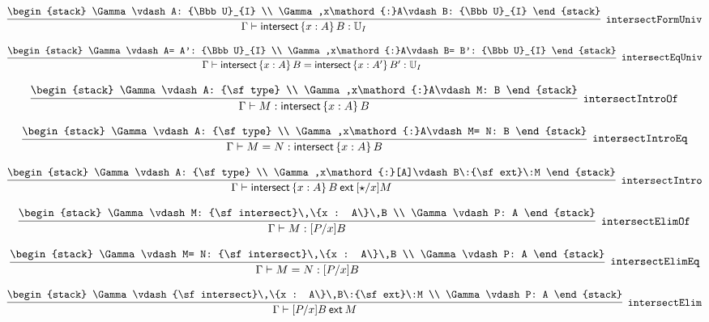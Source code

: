 \[
\infer[{\tt intersectFormUniv}]{\Gamma \vdash {\sf intersect}\,\{x : A\}\,B: {\Bbb U}_{I}}{
\begin{stack}
\Gamma \vdash A: {\Bbb U}_{I}
\\
\Gamma ,x\mathord{:}A\vdash B: {\Bbb U}_{I}
\end{stack}}
\]

\[
\infer[{\tt intersectEqUniv}]{\Gamma \vdash {\sf intersect}\,\{x : A\}\,B= {\sf intersect}\,\{x : A'\}\,B': {\Bbb U}_{I}}{
\begin{stack}
\Gamma \vdash A= A': {\Bbb U}_{I}
\\
\Gamma ,x\mathord{:}A\vdash B= B': {\Bbb U}_{I}
\end{stack}}
\]

\[
\infer[{\tt intersectIntroOf}]{\Gamma \vdash M: {\sf intersect}\,\{x : A\}\,B}{
\begin{stack}
\Gamma \vdash A: {\sf type}
\\
\Gamma ,x\mathord{:}A\vdash M: B
\end{stack}}
\]

\[
\infer[{\tt intersectIntroEq}]{\Gamma \vdash M= N: {\sf intersect}\,\{x : A\}\,B}{
\begin{stack}
\Gamma \vdash A: {\sf type}
\\
\Gamma ,x\mathord{:}A\vdash M= N: B
\end{stack}}
\]

\[
\infer[{\tt intersectIntro}]{\Gamma \vdash {\sf intersect}\,\{x : A\}\,B\:{\sf ext}\:[\star /x]M}{
\begin{stack}
\Gamma \vdash A: {\sf type}
\\
\Gamma ,x\mathord{:}[A]\vdash B\:{\sf ext}\:M
\end{stack}}
\]

\[
\infer[{\tt intersectElimOf}]{\Gamma \vdash M: [P/x]B}{
\begin{stack}
\Gamma \vdash M: {\sf intersect}\,\{x : A\}\,B
\\
\Gamma \vdash P: A
\end{stack}}
\]

\[
\infer[{\tt intersectElimEq}]{\Gamma \vdash M= N: [P/x]B}{
\begin{stack}
\Gamma \vdash M= N: {\sf intersect}\,\{x : A\}\,B
\\
\Gamma \vdash P: A
\end{stack}}
\]

\[
\infer[{\tt intersectElim}]{\Gamma \vdash [P/x]B\:{\sf ext}\:M}{
\begin{stack}
\Gamma \vdash {\sf intersect}\,\{x : A\}\,B\:{\sf ext}\:M
\\
\Gamma \vdash P: A
\end{stack}}
\]

